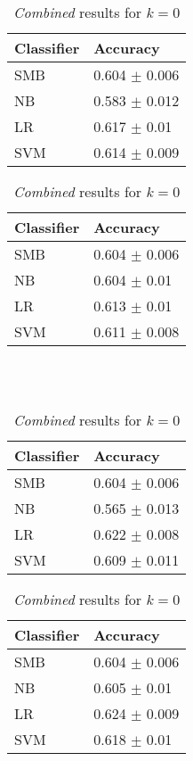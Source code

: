 \begin{table}[h]
\begin{minipage}[b]{.50\textwidth}
\centering
  \begin{tabular}{|l|l|} %
  \hline
  		\textbf{Classifier} & \textbf{Accuracy} \\ \hline
		SMB & 0.604 $\pm$ 0.006 \\ \hline
		NB & 0.583 $\pm$ 0.012 \\ \hline
		LR & 0.617 $\pm$ 0.01 \\ \hline
		SVM & 0.614 $\pm$ 0.009 \\ \hline
  \end{tabular}
  \caption{\emph{Traits} results for $k=0$}
\end{minipage}
\begin{minipage}[b]{.50\textwidth}
\centering
  \begin{tabular}{|l|l|} %
  \hline
  		\textbf{Classifier} & \textbf{Accuracy} \\ \hline
		SMB & 0.604 $\pm$ 0.006 \\ \hline
		NB & 0.604 $\pm$ 0.01 \\ \hline
		LR & 0.613 $\pm$ 0.01 \\ \hline
		SVM & 0.611 $\pm$ 0.008 \\ \hline
  \end{tabular}
  \caption{\emph{Pages} results for $k=0$}
\end{minipage}
\\
\\
\begin{minipage}[b]{.50\textwidth}
\centering
  \begin{tabular}{|l|l|} %
  \hline
  		\textbf{Classifier} & \textbf{Accuracy} \\ \hline
		SMB & 0.604 $\pm$ 0.006 \\ \hline
		NB & 0.565 $\pm$ 0.013 \\ \hline
		LR & 0.622 $\pm$ 0.008 \\ \hline
		SVM & 0.609 $\pm$ 0.011 \\ \hline
  \end{tabular}
  \caption{\emph{Groups} results for $k=0$}
\end{minipage}
\begin{minipage}[b]{.50\textwidth}
\centering
  \begin{tabular}{|l|l|} %
  \hline
  		\textbf{Classifier} & \textbf{Accuracy} \\ \hline
		SMB & 0.604 $\pm$ 0.006 \\ \hline
		NB & 0.605 $\pm$ 0.01 \\ \hline
		LR & 0.624 $\pm$ 0.009 \\ \hline
		SVM & 0.618 $\pm$ 0.01 \\ \hline
  \end{tabular}
  \caption{\emph{Combined} results for $k=0$}
\end{minipage}
\end{table}

